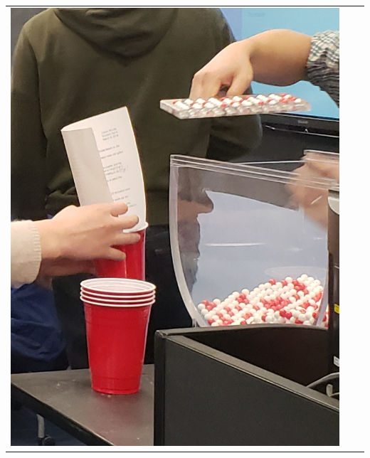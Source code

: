 \documentclass[
  letterpaper,
  DIV=11,
  numbers=noendperiod]{scrreprt}
\theoremstyle{definition}
\theoremstyle{remark}
\begin{document}
\begin{longtable}[]{@{}
  >{\raggedright\arraybackslash}p{}
  >{\raggedright\arraybackslash}p{}
  >{\raggedright\arraybackslash}p{}@{}}
\toprule()
\endhead
\includegraphics{images/sampling/tactile_2_a.jpg} &

\end{longtable}
\end{document}
